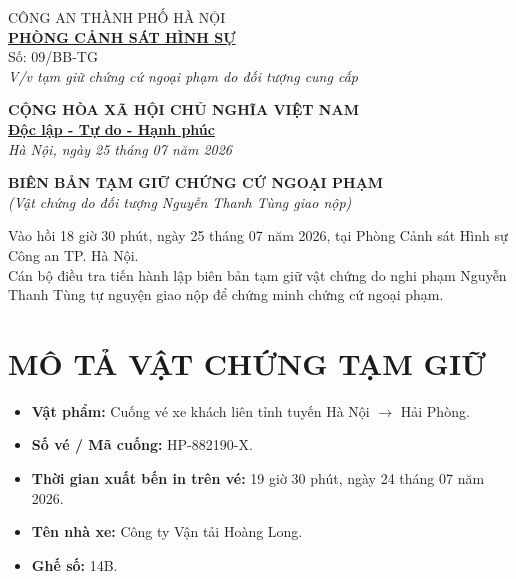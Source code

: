 \documentclass[12pt,a4paper]{article}
\begin{document}
\noindent
\begin{minipage}[t]{0.45\textwidth}
    \begin{center}
        \small
        CÔNG AN THÀNH PHỐ HÀ NỘI\\
        \textbf{\underline{PHÒNG CẢNH SÁT HÌNH SỰ}}\\[0.1cm]
        Số: 09/BB-TG\\
        \textit{V/v tạm giữ chứng cứ ngoại phạm do đối tượng cung cấp}
    \end{center}
\end{minipage}
\hfill
\begin{minipage}[t]{0.52\textwidth}
    \begin{center}
        \small
        \textbf{CỘNG HÒA XÃ HỘI CHỦ NGHĨA VIỆT NAM}\\
        \textbf{\underline{Độc lập - Tự do - Hạnh phúc}}\\[0.1cm]
        \textit{Hà Nội, ngày 25 tháng 07 năm 2026}
    \end{center}
\end{minipage}

\vspace{0.6cm}

\begin{center}
    \textbf{\large BIÊN BẢN TẠM GIỮ CHỨNG CỨ NGOẠI PHẠM}\\
    \textit{(Vật chứng do đối tượng Nguyễn Thanh Tùng giao nộp)}
\end{center}

\vspace{0.3cm}

\noindent Vào hồi 18 giờ 30 phút, ngày 25 tháng 07 năm 2026, tại Phòng Cảnh sát Hình sự Công an TP. Hà Nội.\\
Cán bộ điều tra tiến hành lập biên bản tạm giữ vật chứng do nghi phạm Nguyễn Thanh Tùng tự nguyện giao nộp để chứng minh chứng cứ ngoại phạm.

\section*{MÔ TẢ VẬT CHỨNG TẠM GIỮ}
\begin{itemize}[leftmargin=1.5cm]
    \item \textbf{Vật phẩm:} Cuống vé xe khách liên tỉnh tuyến Hà Nội $\rightarrow$ Hải Phòng.
    \item \textbf{Số vé / Mã cuống:} HP-882190-X.
    \item \textbf{Thời gian xuất bến in trên vé:} 19 giờ 30 phút, ngày 24 tháng 07 năm 2026.
    \item \textbf{Tên nhà xe:} Công ty Vận tải Hoàng Long.
    \item \textbf{Ghế số:} 14B.
\end{itemize}
\end{document}
